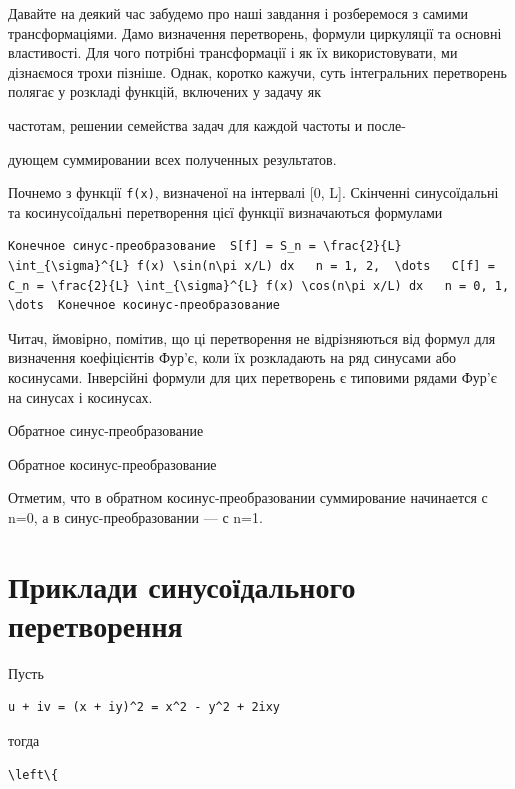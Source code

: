 \documentclass[
  ukrainian,
]{article}
\begin{document}
Давайте на деякий час забудемо про наші завдання і розберемося з самими
трансформаціями. Дамо визначення перетворень, формули циркуляції та
основні властивості. Для чого потрібні трансформації і як їх
використовувати, ми дізнаємося трохи пізніше. Однак, коротко кажучи,
суть інтегральних перетворень полягає у розкладі функцій, включених у
задачу як

частотам, решении семейства задач для каждой частоты и после-

дующем суммировании всех полученных результатов.

Почнемо з функції \texttt{f(x)}, визначеної на інтервалі {[}0, L{]}.
Скінченні синусоїдальні та косинусоїдальні перетворення цієї функції
визначаються формулами

\begin{verbatim}
Конечное синус-преобразование  S[f] = S_n = \frac{2}{L} \int_{\sigma}^{L} f(x) \sin(n\pi x/L) dx   n = 1, 2,  \dots   C[f] = C_n = \frac{2}{L} \int_{\sigma}^{L} f(x) \cos(n\pi x/L) dx   n = 0, 1, \dots  Конечное косинус-преобразование
\end{verbatim}

Читач, ймовірно, помітив, що ці перетворення не відрізняються від формул
для визначення коефіцієнтів Фур'є, коли їх розкладають на ряд синусами
або косинусами. Інверсійні формули для цих перетворень є типовими рядами
Фур'є на синусах і косинусах.

Обратное синус-преобразование

Обратное косинус-преобразование

Отметим, что в обратном косинус-преобразовании суммирование начинается с
n=0, а в синус-преобразовании --- с n=1.

\section{Приклади синусоїдального
перетворення}\label{ux43fux440ux438ux43aux43bux430ux434ux438-ux441ux438ux43dux443ux441ux43eux457ux434ux430ux43bux44cux43dux43eux433ux43e-ux43fux435ux440ux435ux442ux432ux43eux440ux435ux43dux43dux44f}

Пусть

\begin{verbatim}
u + iv = (x + iy)^2 = x^2 - y^2 + 2ixy
\end{verbatim}

тогда

\begin{verbatim}
\left\{
\end{verbatim}
\end{document}
